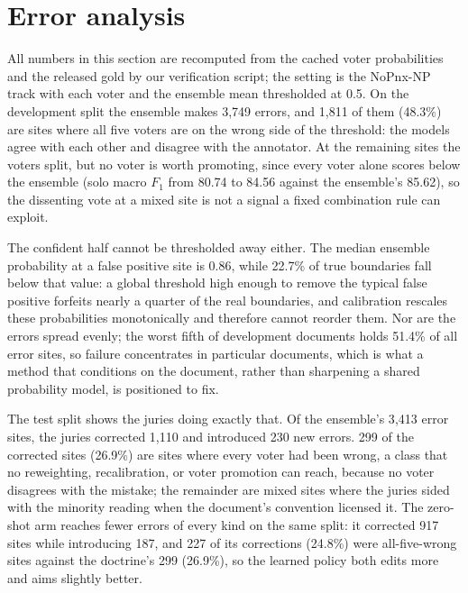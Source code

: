 \documentclass[11pt]{article}
\begin{document}
\section{Error analysis}
\label{sec:erroranalysis}
All numbers in this section are recomputed from the cached voter probabilities and the
released gold by our verification script; the setting is the NoPnx-NP track with each
voter and the ensemble mean thresholded at 0.5. On the development split the ensemble
makes 3{,}749 errors, and 1{,}811 of them (48.3\%) are sites where all five voters are
on the wrong side of the threshold: the models agree with each other and disagree with
the annotator. At the remaining sites the voters split, but no voter is worth
promoting, since every voter alone scores below the ensemble (solo macro $F_1$ from
80.74 to 84.56 against the ensemble's 85.62), so the dissenting vote at a mixed site
is not a signal a fixed combination rule can exploit.

The confident half cannot be thresholded away either. The median ensemble probability
at a false positive site is 0.86, while 22.7\% of true boundaries fall below that
value: a global threshold high enough to remove the typical false positive forfeits
nearly a quarter of the real boundaries, and calibration rescales these probabilities
monotonically and therefore cannot reorder them. Nor are the errors spread evenly; the
worst fifth of development documents holds 51.4\% of all error sites, so failure
concentrates in particular documents, which is what a method that conditions on the
document, rather than sharpening a shared probability model, is positioned to fix.

The test split shows the juries doing exactly that. Of the ensemble's 3{,}413 error
sites, the juries corrected 1{,}110 and introduced 230 new errors. 299 of the
corrected sites (26.9\%) are sites where every voter had been wrong, a class that no
reweighting, recalibration, or voter promotion can reach, because no voter disagrees
with the mistake; the remainder are mixed sites where the juries sided with the
minority reading when the document's convention licensed it. The zero-shot arm reaches
fewer errors of every kind on the same split: it corrected 917 sites while introducing
187, and 227 of its corrections (24.8\%) were all-five-wrong sites against the
doctrine's 299 (26.9\%), so the learned policy both edits more and aims slightly
better.
\end{document}
